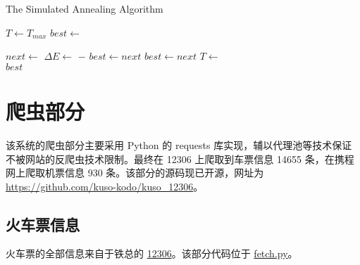 \documentclass[lang=cn,blue]{elegantbook}
\begin{document}
\begin{algorithm}[H]
	\caption{\label{sa}The Simulated Annealing Algorithm}
\begin{algorithmic}[1]
	\State $T\gets T_{max}$
	\State $best\gets$ \textbf{}
	
	\State $next\gets $ \textbf{}
	\State $\Delta E\gets$ \textbf{} $-$ \textbf{}
	\State $best\gets next$
	\State $best\gets next$
	\EndIf
	\State $T\gets$ \textbf{}
	\EndWhile \\
	\Return $best$
	\EndProcedure
\end{algorithmic}
\end{algorithm}


\chapter{爬虫部分}
该系统的爬虫部分主要采用 Python 的 requests 库实现，辅以代理池等技术保证不被网站的反爬虫技术限制。最终在 12306 上爬取到车票信息 14655 条，在携程网上爬取机票信息 930 条。该部分的源码现已开源，网址为 \href{https://github.com/kuso-kodo/kuso\_12306}{https://github.com/kuso-kodo/kuso\_12306}。

\section{火车票信息}
火车票的全部信息来自于铁总的 \href{https://www.12306.cn}{12306}。该部分代码位于 \href{https://github.com/kuso-kodo/kuso_12306/blob/master/src_12306/fetch.py}{fetch.py}。
\end{document}
